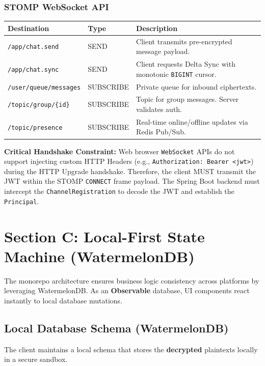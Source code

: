 \documentclass[12pt, a4paper]{article}
\begin{document}
\subsubsection{STOMP WebSocket API}
\begin{longtable}{|p{4cm}|p{2.5cm}|p{8cm}|}
\hline
\textbf{Destination} & \textbf{Type} & \textbf{Description} \\ \hline
\endfirsthead
\hline
\texttt{/app/chat.send} & SEND & Client transmits pre-encrypted message payload. \\ \hline
\texttt{/app/chat.sync} & SEND & Client requests Delta Sync with monotonic \texttt{BIGINT} cursor. \\ \hline
\texttt{/user/queue/messages} & SUBSCRIBE & Private queue for inbound ciphertexts. \\ \hline
\texttt{/topic/group/\{id\}} & SUBSCRIBE & Topic for group messages. Server validates auth. \\ \hline
\texttt{/topic/presence} & SUBSCRIBE & Real-time online/offline updates via Redis Pub/Sub. \\ \hline
\end{longtable}

\noindent\textbf{Critical Handshake Constraint:} Web browser \texttt{WebSocket} APIs do not support injecting custom HTTP Headers (e.g., \texttt{Authorization: Bearer <jwt>}) during the HTTP Upgrade handshake. Therefore, the client MUST transmit the JWT within the STOMP \texttt{CONNECT} frame payload. The Spring Boot backend must intercept the \texttt{ChannelRegistration} to decode the JWT and establish the \texttt{Principal}.

\section{Section C: Local-First State Machine (WatermelonDB)}
\label{sec:sync}

The monorepo architecture ensures business logic consistency across platforms by leveraging WatermelonDB. As an \textbf{Observable} database, UI components react instantly to local database mutations.

\subsection{Local Database Schema (WatermelonDB)}
The client maintains a local schema that stores the \textbf{decrypted} plaintexts locally in a secure sandbox.
\end{document}
